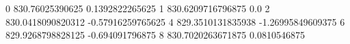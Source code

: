 0 830.76025390625 0.1392822265625
1 830.6209716796875 0.0
2 830.0418090820312 -0.57916259765625
4 829.3510131835938 -1.26995849609375
6 829.9268798828125 -0.694091796875
8 830.7020263671875 0.0810546875

